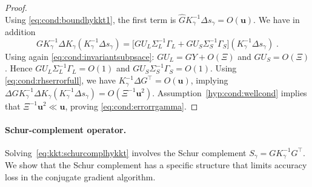\documentclass[smallextended]{svjour3}
\newcommand{\epstol}{\mathbf{u}}
\begin{document}
\begin{proof}
\begin{equation}
\end{equation}
Using \eqref{eq:cond:boundhykkt1}, the first term is $\widehat{G} K_\gamma^{-1} \Delta s_\gamma = O(\epstol)$.
We have in addition
\begin{equation}
  G K_\gamma^{-1}\Delta K_\gamma (K_\gamma^{-1} \Delta s_\gamma)  =
  \big[ G U_L \Sigma_L^{-1} \Gamma_L + G U_S \Sigma_S^{-1} \Gamma_S \big] (K_\gamma^{-1} \Delta s_\gamma) \; .
\end{equation}
Using again \eqref{eq:cond:invariantsubpsace}:
$G U_L = G Y + O(\Xi)$ and $G U_S = O(\Xi)$. Hence
$G U_L \Sigma_L^{-1} \Gamma_L = O(1)$ and $G U_S \Sigma_S^{-1} \Gamma_S = O(1)$.
Using \eqref{eq:cond:rhserrorfull}, we have $K_\gamma^{-1} \Delta G^\top = O(\epstol)$,
implying $\Delta G K_\gamma^{-1} \Delta K_\gamma (K_\gamma^{-1} \Delta s_\gamma) = O(\Xi^{-1} \epstol^{2})$.
Assumption~\ref{hyp:cond:wellcond} implies that $\Xi^{-1} \epstol^2 \ll \epstol$,
proving \eqref{eq:cond:errorrgamma}.
\end{proof}

\paragraph{Schur-complement operator.}
Solving~\eqref{eq:kkt:schurcomplhykkt}
involves the Schur complement $S_\gamma = G K_\gamma^{-1} G^\top$.
We show that the Schur complement
has a specific structure that limits accuracy loss
in the conjugate gradient algorithm.
\end{document}
